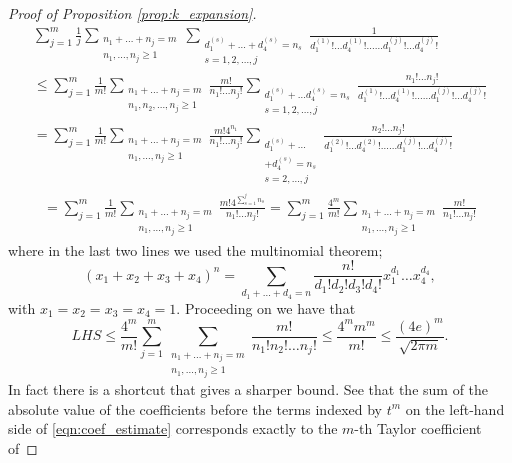 \documentclass[11pt]{amsart}
\theoremstyle{plain}
\theoremstyle{remark}
\numberwithin{equation}{section}
\begin{document}
\begin{proof}[Proof of Proposition \ref{prop:k_expansion}]
\begin{multline}\label{eqn:coef_estimate}
\sum_{j=1}^{m}\frac{1}{j}
\sum_{
\substack{
n_1+\ldots +n_j=m
\\n_1,\ldots,n_j\geq 1
}}
\sum_{
\substack{
d_1^{(s)}+\ldots +d_4^{(s)}=n_s
\\
s=1,2,\ldots, j 
}
}
\frac{1}{d_1^{(1)}! \ldots d_4^{(1)}!\ldots \ldots d_1^{(j)}! \ldots d_4^{(j)}!}
%
%
\\\leq
\sum_{j=1}^m
\frac{1}{m!}
\sum_{
\substack{
n_1+\ldots +n_j=m
\\n_1,n_2,\ldots,n_j\geq 1
}}
\frac{m!}{n_1!\ldots n_j!}
\sum_{
\substack{
d_1^{(s)}+\ldots d_4^{(s)}=n_s
\\
s=1,2,\ldots, j 
}
}
\frac{n_1!\ldots n_j!}{d_1^{(1)}! \ldots d_4^{(1)}!\ldots\ldots d_1^{(j)}! \ldots d_4^{(j)}!}
%
%
%
\\=
\sum_{j=1}^m
\frac{1}{m!}
\sum_{
\substack{
n_1+\ldots +n_j=m
\\n_1,\ldots,n_j\geq 1
}}
\frac{m! 4^{n_1}}{n_1!\ldots n_j!}
\sum_{
\substack{
d_1^{(s)}
+
\ldots
\\
+ d_4^{(s)}=n_s
\\
s=2,\ldots, j 
}
}
\frac{n_2!\ldots n_j!}{d_1^{(2)}! \ldots d_4^{(2)}!\ldots\ldots d_1^{(j)}! \ldots d_4^{(j)}!}
\end{multline}
\begin{multline*}
=
\sum_{j=1}^m
\frac{1}{m!}
\sum_{
\substack{
n_1+\ldots +n_j=m
\\n_1,\ldots,n_j\geq 1
}}
\frac{m! 4^{\sum_{s=1}^{j}n_s}}{n_1!\ldots n_j!}
=
\sum_{j=1}^m
\frac{4^m}{m!} 
\sum_{
\substack{
n_1+\ldots +n_j=m
\\n_1,\ldots,n_j\geq 1
}}
\frac{m!}{n_1!\ldots n_j!}
\end{multline*}
where in the last two lines we used the multinomial theorem;
$$(x_1+x_2+x_3+x_4)^n= \sum_{d_1+\ldots+d_4=n} \frac{n!}{d_1!d_2!d_3!d_4!} x_1^{d_1}\ldots x_4^{d_4},$$
with $x_1=x_2=x_3=x_4=1.$ Proceeding on we have that
\begin{equation}
LHS\leq \frac{4^m}{m!}
\sum_{j=1}^m
\sum_{
\substack{
n_1+\ldots +n_j=m
\\n_1,\ldots,n_j\geq 1
}}
\frac{m!}{n_1!n_2!\ldots n_j!}
\leq \frac{4^m m^m}{m!}
\leq \frac{(4e)^m}{\sqrt{2\pi m}}.
\end{equation}
In fact there is a shortcut that gives a sharper bound. See that the sum of the absolute value of the coefficients before the terms indexed by $t^m$ on the left-hand side of \eqref{eqn:coef_estimate} corresponds exactly to the $m$-th Taylor coefficient of

\end{proof}
\end{document}

